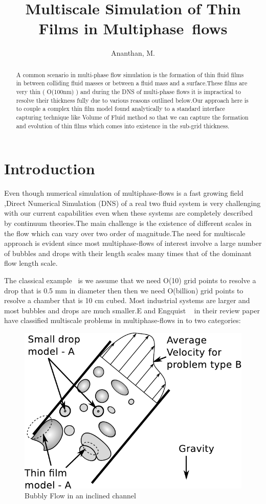 \documentclass[
manuscript=article]{achemso}
\author{Ananthan, M.}
\affiliation{Department of Mechanical Engineering, Indian Institute of Science, Bangalore}
\title[\texttt{achemso} demonstration]
{Multiscale Simulation of Thin Films in Multiphase~flows}
\begin{document}
\begin{abstract}
A common scenario in multi-phase flow simulation  is the formation of thin fluid films in between colliding fluid masses or between a fluid mass and a surface.These films are very thin ( O(100nm) ) and during the DNS of multi-phase flows it is impractical to resolve their thickness fully due to various reasons outlined below.Our approach here is to couple a complex thin film model found analytically to a standard interface capturing technique like Volume of Fluid method so that we can capture the formation and evolution of thin films which comes into existence in the sub-grid thickness.
\end{abstract}


\section{Introduction}

Even though numerical simulation of multiphase-flows is a fast growing field ,Direct Numerical Simulation
(DNS) of a real two fluid system is very challenging with our current capabilities even when these systems are completely described by continuum theories.The main challenge is the existence of different scales in the flow which can vary over two order of magnitude.The need for multiscale approach is evident since most multiphase-flows of interest involve a large number of bubbles and drops with their length scales many times that of the dominant flow length scale.

The classical example~\cite{1} is we assume that we need O(10) grid points to resolve a drop that is 0.5 mm in diameter then then we need O(billion) grid points to resolve a chamber that is 10 cm cubed.
Most industrial systems are larger and most bubbles and drops are much smaller.E and Engquist ~\cite{2} in their review paper have classified multiscale problems in multiphase-flows in to two categories:

\begin{figure}[h]
 \includegraphics[scale=0.7]{drawing}
 \caption{Bubbly Flow in an inclined channel}
  \label{sch:example}
\end{figure}
\end{document}
